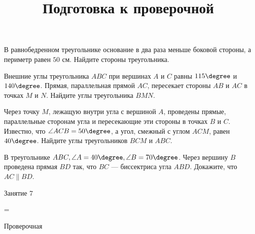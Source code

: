 \begin{homework}[number=3]
	\begin{listofex}
		\item В равнобедренном треугольнике основание в два раза меньше боковой стороны, а периметр равен \(50\) см. Найдите стороны треугольника.
		\item Внешние углы треугольника \(ABC\) при вершинах \(A\) и \(C\) равны \(115\degree\) и \(140\degree \). Прямая, параллельная прямой \(AC\), пересекает стороны \(AB\) и \(AC\) в точках \(M\) и \(N\). Найдите углы треугольника \(BMN\).
		\item Через точку \(M\), лежащую внутри угла с вершиной \(A\), проведены прямые, параллельные сторонам угла и пересекающие эти стороны в точках \(B\) и \(C\). Известно, что \(\angle ACB = 50\degree\), а угол, смежный с углом \(ACM\), равен \(40\degree\). Найдите углы треугольников \(BCM\) и \(ABC\).
		\item В треугольнике \( ABC, \angle A = 40 \degree, \angle B = 70 \degree \). Через вершину \(B\) проведена прямая \(BD\) так, что \(BC\) --- биссектриса угла \(ABD\). Докажите, что \(AC \parallel BD\).
	\end{listofex}
\end{homework}

\begin{class}[number=7]
	\title{Подготовка к проверочной}
	\begin{listofex}
		\item Занятие 7
	\end{listofex}
\end{class}

=%
\begin{exam}
	\begin{listofex}
		\item Проверочная
	\end{listofex}
\end{exam}
